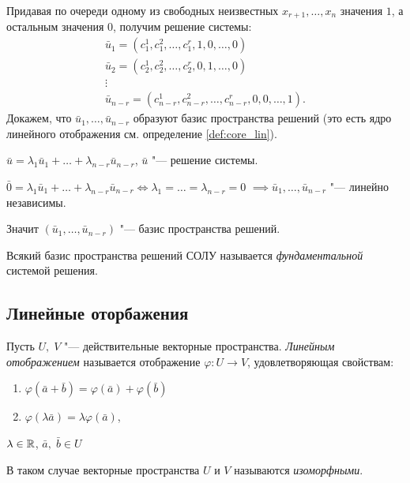Придавая по очереди одному из свободных неизвестных $x_{r + 1}, \ldots, x_n$ значения $1$, а остальным значения $0$, получим решение системы:
$$
\begin{array}{l}
    \bar{u}_1 = (c_1^1,c_1^2,\ldots,c_1^r,1,0,\ldots,0) \\
    \bar{u}_2 = (c_2^1,c_2^2,\ldots,c_2^r,0,1,\ldots,0) \\
    \vdots \\
    \bar{u}_{n - r} = (c_{n - r}^1, c_{n - r}^2, \ldots, c_{n - r}^r, 0, 0, \ldots, 1).
\end{array}
$$
Докажем, что $\bar{u}_1, \ldots, \bar{u}_{n - r}$ образуют базис пространства решений (это есть ядро линейного отображения см. определение \ref{def:core_lin}).
\begin{Proof}
    $\bar{u} = \lambda_1\bar{u}_1 + \ldots + \lambda_{n - r}\bar{u}_{n - r}$, $\bar{u}$ "--- решение системы.

    $\bar{0} = \lambda_1\bar{u}_1 + \ldots + \lambda_{n - r}\bar{u}_{n - r} \Leftrightarrow \lambda_1 = \ldots = \lambda_{n - r} = 0$
    $\implies \bar{u}_1, \ldots, \bar{u}_{n - r}$ "--- линейно независимы.
    
    Значит $(\bar{u}_1, \ldots, \bar{u}_{n - r})$ "--- базис пространства решений. 
\end{Proof}

\begin{definition}
    Всякий базис пространства решений СОЛУ называется \textit{фундаментальной} системой решения.
\end{definition}

\subsection*{Линейные оторбажения}
\begin{definition}
    Пусть $U,\;V$ "--- действительные векторные пространства.
    \textit{Линейным отображением} называется отображение $\varphi: U \to V$, удовлетворяющая свойствам:
    \begin{enumerate}
        \item $\varphi(\bar{a} + \bar{b}) = \varphi(\bar{a}) + \varphi(\bar{b})$
        \item $\varphi(\lambda\bar{a}) = \lambda\varphi(\bar{a})$,
    \end{enumerate}
    $\lambda \in \mathbb{R}$, $\bar{a},\;\bar{b} \in U$
    
\end{definition}
В таком случае векторные пространства $U$ и $V$ называются \textit{изоморфными}. 

